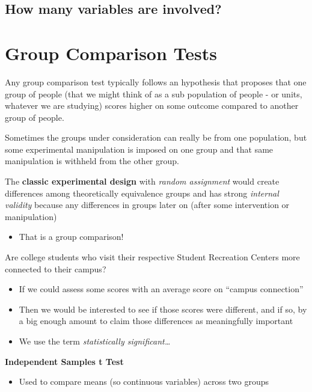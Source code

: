 \documentclass[
  letterpaper,
  DIV=11,
  numbers=noendperiod]{scrreprt}
\providecommand{\tightlist}{%
  \setlength{\itemsep}{0pt}\setlength{\parskip}{0pt}}
\begin{document}
\section{How many variables are
involved?}\label{how-many-variables-are-involved}


\chapter{Group Comparison Tests}\label{group-comparison-tests}

Any group comparison test typically follows an hypothesis that proposes
that one group of people (that we might think of as a sub population of
people - or units, whatever we are studying) scores higher on some
outcome compared to another group of people.

Sometimes the groups under consideration can really be from one
population, but some experimental manipulation is imposed on one group
and that same manipulation is withheld from the other group.

The \textbf{classic experimental design} with \emph{random assignment}
would create differences among theoretically equivalence groups and has
strong \emph{internal validity} because any differences in groups later
on (after some intervention or manipulation)

\begin{itemize}
\tightlist
\item
  That is a group comparison!
\end{itemize}

Are college students who visit their respective Student Recreation
Centers more connected to their campus?

\begin{itemize}
\item
  If we could assess some scores with an average score on ``campus
  connection''
\item
  Then we would be interested to see if those scores were different, and
  if so, by a big enough amount to claim those differences as
  meaningfully important
\item
  We use the term \emph{statistically significant\ldots{}}
\end{itemize}

\textbf{Independent Samples t Test}

\begin{itemize}
\tightlist
\item
  Used to compare means (so continuous variables) across two groups
\end{itemize}
\end{document}
